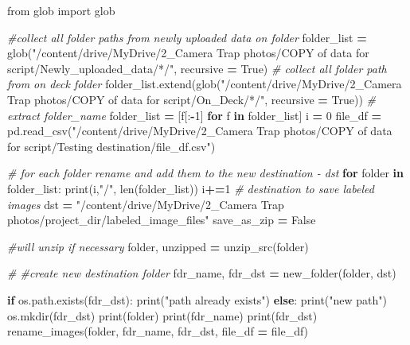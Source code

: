 \documentclass[
]{article}
\newenvironment{Shaded}{\begin{snugshade}}{\end{snugshade}}
\newcommand{\BuiltInTok}[1]{#1}
\newcommand{\CommentTok}[1]{\textcolor[rgb]{0.56,0.35,0.01}{\textit{#1}}}
\newcommand{\ControlFlowTok}[1]{\textcolor[rgb]{0.13,0.29,0.53}{\textbf{#1}}}
\newcommand{\DecValTok}[1]{\textcolor[rgb]{0.00,0.00,0.81}{#1}}
\newcommand{\ImportTok}[1]{#1}
\newcommand{\KeywordTok}[1]{\textcolor[rgb]{0.13,0.29,0.53}{\textbf{#1}}}
\newcommand{\NormalTok}[1]{#1}
\newcommand{\OperatorTok}[1]{\textcolor[rgb]{0.81,0.36,0.00}{\textbf{#1}}}
\newcommand{\StringTok}[1]{\textcolor[rgb]{0.31,0.60,0.02}{#1}}
\newcommand{\VariableTok}[1]{\textcolor[rgb]{0.00,0.00,0.00}{#1}}
\begin{document}
\begin{Shaded}
\begin{Highlighting}[]
\ImportTok{from}\NormalTok{ glob }\ImportTok{import}\NormalTok{ glob}

\CommentTok{\#collect all folder paths from newly uploaded data on folder}
\NormalTok{folder\_list }\OperatorTok{=}\NormalTok{ glob(}\StringTok{"/content/drive/MyDrive/2\_Camera Trap photos/COPY of data for script/Newly\_uploaded\_data/*/"}\NormalTok{, recursive }\OperatorTok{=} \VariableTok{True}\NormalTok{)}
\CommentTok{\# collect all folder path from on deck folder}
\NormalTok{folder\_list.extend(glob(}\StringTok{"/content/drive/MyDrive/2\_Camera Trap photos/COPY of data for script/On\_Deck/*/"}\NormalTok{, recursive }\OperatorTok{=} \VariableTok{True}\NormalTok{))}
\CommentTok{\# extract folder\_name }
\NormalTok{folder\_list }\OperatorTok{=}\NormalTok{ [f[:}\OperatorTok{{-}}\DecValTok{1}\NormalTok{] }\ControlFlowTok{for}\NormalTok{ f }\KeywordTok{in}\NormalTok{ folder\_list]}
\NormalTok{i }\OperatorTok{=} \DecValTok{0}
\NormalTok{file\_df }\OperatorTok{=}\NormalTok{ pd.read\_csv(}\StringTok{"/content/drive/MyDrive/2\_Camera Trap photos/COPY of data for script/Testing destination/file\_df.csv"}\NormalTok{)}

\CommentTok{\# for each folder rename and add them to the new destination {-} dst}
\ControlFlowTok{for}\NormalTok{ folder }\KeywordTok{in}\NormalTok{ folder\_list:}
  \BuiltInTok{print}\NormalTok{(i,}\StringTok{"/"}\NormalTok{, }\BuiltInTok{len}\NormalTok{(folder\_list))}
\NormalTok{  i}\OperatorTok{+=}\DecValTok{1}
  \CommentTok{\# destination to save labeled images}
\NormalTok{  dst }\OperatorTok{=} \StringTok{"/content/drive/MyDrive/2\_Camera Trap photos/project\_dir/labeled\_image\_files"}
\NormalTok{  save\_as\_zip }\OperatorTok{=} \VariableTok{False}

  \CommentTok{\#will unzip if necessary}
\NormalTok{  folder, unzipped }\OperatorTok{=}\NormalTok{ unzip\_src(folder)}

  \CommentTok{\# \#create new destination folder}
\NormalTok{  fdr\_name, fdr\_dst }\OperatorTok{=}\NormalTok{ new\_folder(folder, dst)}

  \ControlFlowTok{if}\NormalTok{ os.path.exists(fdr\_dst):}
    \BuiltInTok{print}\NormalTok{(}\StringTok{"path already exists"}\NormalTok{)}
  \ControlFlowTok{else}\NormalTok{:}
    \BuiltInTok{print}\NormalTok{(}\StringTok{"new path"}\NormalTok{)}
\NormalTok{    os.mkdir(fdr\_dst)}
  \BuiltInTok{print}\NormalTok{(folder)}
  \BuiltInTok{print}\NormalTok{(fdr\_name)}
  \BuiltInTok{print}\NormalTok{(fdr\_dst)}
\NormalTok{  rename\_images(folder, fdr\_name, fdr\_dst, file\_df }\OperatorTok{=}\NormalTok{ file\_df)}
\end{Highlighting}
\end{Shaded}
\end{document}
